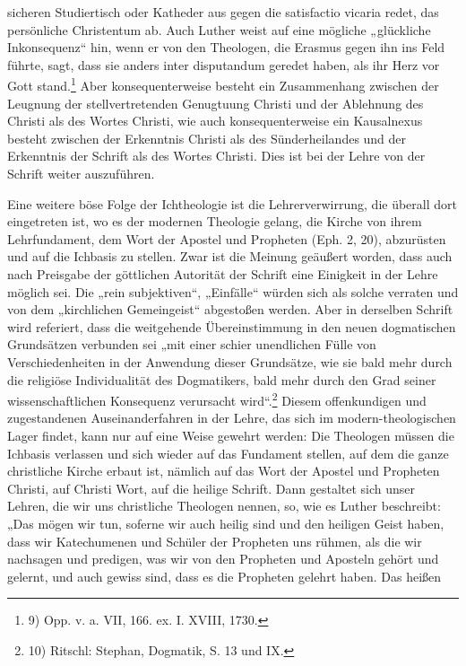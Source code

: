sicheren Studiertisch oder Katheder aus gegen die satisfactio vicaria redet, das persönliche Christentum ab. Auch Luther weist auf eine mögliche „glückliche Inkonsequenz“ hin, wenn er von den Theologen, die Erasmus gegen ihn ins Feld führte, sagt, dass sie anders inter disputandum geredet haben, als ihr Herz vor Gott stand.\footnote{9) Opp. v. a. VII, 166. ex. I. XVIII, 1730.} Aber konsequenterweise besteht ein Zusammenhang zwischen der Leugnung der stellvertretenden Genugtuung Christi und der Ablehnung des Christi als des Wortes Christi, wie auch konsequenterweise ein Kausalnexus besteht zwischen der Erkenntnis Christi als des Sünderheilandes und der Erkenntnis der Schrift als des Wortes Christi. Dies ist bei der Lehre von der Schrift weiter auszuführen.

Eine weitere böse Folge der Ichtheologie ist die Lehrerverwirrung, die überall dort eingetreten ist, wo es der modernen Theologie gelang, die Kirche von ihrem Lehrfundament, dem Wort der Apostel und Propheten (Eph. 2, 20), abzurüsten und auf die Ichbasis zu stellen. Zwar ist die Meinung geäußert worden, dass auch nach Preisgabe der göttlichen Autorität der Schrift eine Einigkeit in der Lehre möglich sei. Die „rein subjektiven“, „Einfälle“ würden sich als solche verraten und von dem „kirchlichen Gemeingeist“ abgestoßen werden. Aber in derselben Schrift wird referiert, dass die weitgehende Übereinstimmung in den neuen dogmatischen Grundsätzen verbunden sei „mit einer schier unendlichen Fülle von Verschiedenheiten in der Anwendung dieser Grundsätze, wie sie bald mehr durch die religiöse Individualität des Dogmatikers, bald mehr durch den Grad seiner wissenschaftlichen Konsequenz verursacht wird“.\footnote{10) Ritschl: Stephan, Dogmatik, S. 13 und IX.} Diesem offenkundigen und zugestandenen Auseinanderfahren in der Lehre, das sich im modern-theologischen Lager findet, kann nur auf eine Weise gewehrt werden: Die Theologen müssen die Ichbasis verlassen und sich wieder auf das Fundament stellen, auf dem die ganze christliche Kirche erbaut ist, nämlich auf das Wort der Apostel und Propheten Christi, auf Christi Wort, auf die heilige Schrift. Dann gestaltet sich unser Lehren, die wir uns christliche Theologen nennen, so, wie es Luther beschreibt: „Das mögen wir tun, soferne wir auch heilig sind und den heiligen Geist haben, dass wir Katechumenen und Schüler der Propheten uns rühmen, als die wir nachsagen und predigen, was wir von den Propheten und Aposteln gehört und gelernt, und auch gewiss sind, dass es die Propheten gelehrt haben. Das heißen